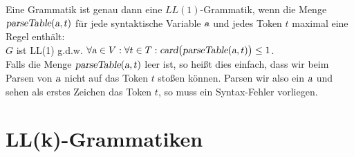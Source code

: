 Eine Grammatik ist genau dann eine $LL(1)$-Grammatik, wenn die Menge
$\textsl{parseTable}(\textsl{a},t)$ f\"ur jede syntaktische Variable $\textsl{a}$ und jedes Token $t$ maximal
eine Regel enth\"alt:
\\[0.2cm]
\hspace*{1.3cm} $G$ ist LL(1) \quad g.d.w. \quad  
$\forall \textsl{a} \in V: \forall t \in T: \textsl{card}\bigl(\textsl{parseTable}(\textsl{a},t)\bigr) \leq 1$.
\\[0.2cm]
Falls die Menge $\textsl{parseTable}(\textsl{a},t)$ leer ist, so hei{\ss}t dies einfach, dass wir beim
Parsen von $\textsl{a}$ nicht auf das Token $t$ sto{\ss}en k\"onnen.  Parsen wir also ein $\textsl{a}$ und sehen
als erstes Zeichen das Token $t$, so muss ein Syntax-Fehler vorliegen.  

\section{LL(k)-Grammatiken}

